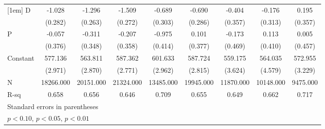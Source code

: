 \begin{table}[htbp]
\begin{tabular}{l*{8}{c}}
[1em]
D                   &      -1.028\sym{***}&      -1.296\sym{***}&      -1.509\sym{***}&      -0.689\sym{**} &      -0.690\sym{**} &      -0.404         &      -0.176         &       0.195         \\
                    &     (0.282)         &     (0.263)         &     (0.272)         &     (0.303)         &     (0.286)         &     (0.357)         &     (0.313)         &     (0.357)         \\
[1em]
P                   &      -0.057         &      -0.311         &      -0.207         &      -0.975\sym{**} &       0.101         &      -0.173         &       0.113         &       0.005         \\
                    &     (0.376)         &     (0.348)         &     (0.358)         &     (0.414)         &     (0.377)         &     (0.469)         &     (0.410)         &     (0.457)         \\
[1em]
Constant            &     577.136\sym{***}&     563.811\sym{***}&     587.362\sym{***}&     601.633\sym{***}&     587.724\sym{***}&     559.175\sym{***}&     564.035\sym{***}&     572.955\sym{***}\\
                    &     (2.971)         &     (2.870)         &     (2.771)         &     (2.962)         &     (2.815)         &     (3.624)         &     (4.579)         &     (3.229)         \\
\hline
N                   &   18266.000         &   20151.000         &   21324.000         &   13485.000         &   19945.000         &   11870.000         &   10148.000         &    9475.000         \\
R-sq                &       0.658         &       0.656         &       0.646         &       0.709         &       0.655         &       0.649         &       0.662         &       0.717         \\
\hline\hline
\multicolumn{9}{l}{\footnotesize Standard errors in parentheses}\\
\multicolumn{9}{l}{\footnotesize \sym{*} \(p<0.10\), \sym{**} \(p<0.05\), \sym{***} \(p<0.01\)}\\
\end{tabular}
\end{table}
